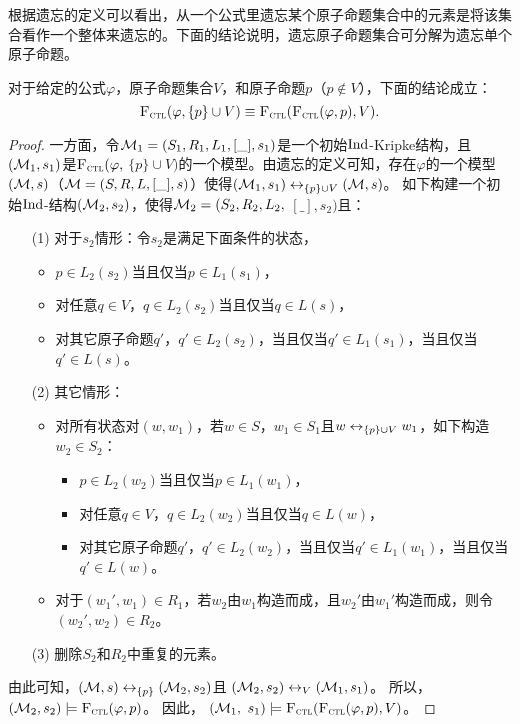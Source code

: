根据遗忘的定义可以看出，从一个公式里遗忘某个原子命题集合中的元素是将该集合看作一个整体来遗忘的。下面的结论说明，遗忘原子命题集合可分解为遗忘单个原子命题。
\begin{proposition}\label{disTF}
	对于给定的公式$\varphi$，原子命题集合$V$，和原子命题$p$（$p\not \in V$），下面的结论成立：
	\[
	{\textsc{F}_{\textsc{ctl}}}(\varphi,\{p\}\cup V) \equiv {\textsc{F}_{\textsc{ctl}}}({\textsc{F}_{\textsc{ctl}}}(\varphi,p),V).
	\]
\end{proposition}
\begin{proof}
	一方面，令${\cal M}_1=(S_1,R_1,L_1,[\_],s_1)$是一个初始$\textrm{Ind}$-Kripke结构，且$({\cal M}_1,s_1)$是${\textsc{F}_{\textsc{ctl}}}(\varphi,$ $\{p\}\cup V)$的一个模型。由遗忘的定义可知，存在$\varphi$的一个模型$(
	{\cal M},s)$（${\cal M}=(S,R,L,[\_],s)$）使得$({\cal M}_1,s_1)\leftrightarrow_{\{p\}\cup V} ({\cal M},s)$。
	如下构建一个初始$\textrm{Ind}$-结构$({\cal M}_2,s_2)$，使得${\cal M}_2=(S_2,R_2,L_2,$ $[\_],s_2)$且：
	\begin{itemize}
		\item[(1)] 对于$s_2$情形：令$s_2$是满足下面条件的状态，
		\begin{itemize}
			\item $p \in L_2(s_2)$当且仅当$p\in L_1(s_1)$，
			\item 对任意$q \in V$，$q \in L_2(s_2)$当且仅当$q\in L(s)$，
			\item 对其它原子命题$q'$，$q' \in L_2(s_2)$，当且仅当$q'\in L_1(s_1)$，当且仅当$q'\in L(s)$。
		\end{itemize}
		
		\item[(2)] 其它情形：
		\begin{itemize}
			\item 对所有状态对$(w,w_1)$，若$w\in S$，$w_1\in S_1$且$w\leftrightarrow_{\{p\}\cup V} w_1$，如下构造$w_2\in S_2$：%
			\begin{itemize}
				\item $p \in L_2(w_2)$当且仅当$p\in L_1(w_1)$，
				\item 对任意$q \in V$，$q \in L_2(w_2)$当且仅当$q\in L(w)$，
				\item 对其它原子命题$q'$，$q' \in L_2(w_2)$，当且仅当$q'\in L_1(w_1)$，当且仅当$q'\in L(w)$。
			\end{itemize}
			\item 对于$(w_1',w_1)\in R_1$，若$w_2$由$w_1$构造而成，且$w_2'$由$w_1'$构造而成，则令$(w_2',w_2)\in R_2$。
		\end{itemize}
		\item[(3)] 删除$S_2$和$R_2$中重复的元素。
	\end{itemize}
	由此可知，$({\cal M}, s) \leftrightarrow_{\{p\}} ({\cal M}_2, s_2)$且 $({\cal M}_2, s_2) \leftrightarrow_V ({\cal M}_1, s_1)$。 所以，$({\cal M}_2, s_2) \models {\textsc{F}_{\textsc{ctl}}}(\varphi, p)$。 因此， $({\cal M}_1,$ $s_1) \models {\textsc{F}_{\textsc{ctl}}}({\textsc{F}_{\textsc{ctl}}}(\varphi, p), V)$。
	

\end{proof}

